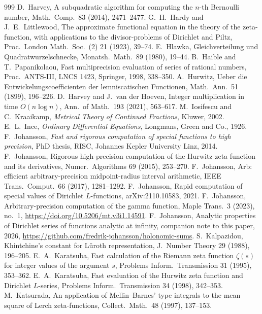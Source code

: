 \documentclass[11pt,reqno]{amsart}
\theoremstyle{definition}
\theoremstyle{remark}
\begin{document}
\begin{thebibliography}{999}
 D.~Harvey, A subquadratic algorithm for computing the $n$-th Bernoulli number, Math.\ Comp.\ 83 (2014), 2471--2477.
 G.~H.~Hardy and J.~E.~Littlewood, The approximate functional equation in the theory of the zeta-function, with applications to the divisor-problems of Dirichlet and Piltz, Proc.\ London Math.\ Soc.\ (2) 21 (1923), 39--74.
 E.~Hlawka, Gleichverteilung und Quadratwurzelschnecke, Monatsh.\ Math.\ 89 (1980), 19--44.
 B.~Haible and T.~Papanikolaou, Fast multiprecision evaluation of series of rational numbers, Proc.\ ANTS-III, LNCS 1423, Springer, 1998, 338--350.
 A.~Hurwitz, Ueber die Entwickelungscoefficienten der lemniscatischen Functionen, Math.\ Ann.\ 51
(1899), 196--226.
 D.~Harvey and J.~van der Hoeven, Integer multiplication in time $O(n\log n)$, Ann.\ of Math.\ 193 (2021), 563--617.
 M.~Iosifescu and C.~Kraaikamp, \emph{Metrical Theory of Continued Fractions}, Kluwer, 2002.
 E.~L.~Ince, \emph{Ordinary Differential Equations}, Longmans, Green and Co., 1926.
 F.~Johansson, \emph{Fast and rigorous computation of special functions to high precision}, PhD thesis,
RISC, Johannes Kepler University Linz, 2014.
 F.~Johansson, Rigorous high-precision computation of the Hurwitz zeta function and its derivatives, Numer.\ Algorithms 69 (2015), 253--270.
 F.~Johansson, Arb: efficient arbitrary-precision midpoint-radius interval arithmetic, IEEE Trans.\ Comput.\ 66 (2017), 1281--1292.
 F.~Johansson, Rapid computation of special values of Dirichlet $L$-functions, arXiv:2110.10583, 2021.
 F.~Johansson, Arbitrary-precision computation of the gamma function, Maple Trans.\ 3 (2023), no.~1, \url{https://doi.org/10.5206/mt.v3i1.14591}.
 F.~Johansson, Analytic properties of Dirichlet series of functions analytic at infinity, companion note
to this paper, 2026, \url{https://github.com/fredrik-johansson/holonomic-sums}.
 S.~Kalpazidou, Khintchine's constant for L\"uroth representation, J.\ Number Theory 29 (1988), 196--205.
 E.~A.~Karatsuba, Fast calculation of the Riemann zeta function $\zeta(s)$ for integer values of the argument $s$, Problems Inform.\ Transmission 31 (1995), 353--362.
 E.~A.~Karatsuba, Fast evaluation of the Hurwitz zeta function and Dirichlet $L$-series, Problems Inform.\ Transmission 34 (1998), 342--353.
 M.~Katsurada, An application of Mellin--Barnes' type integrals to the mean square of Lerch zeta-functions, Collect.\ Math.\ 48 (1997), 137--153.

\end{thebibliography}
\end{document}
